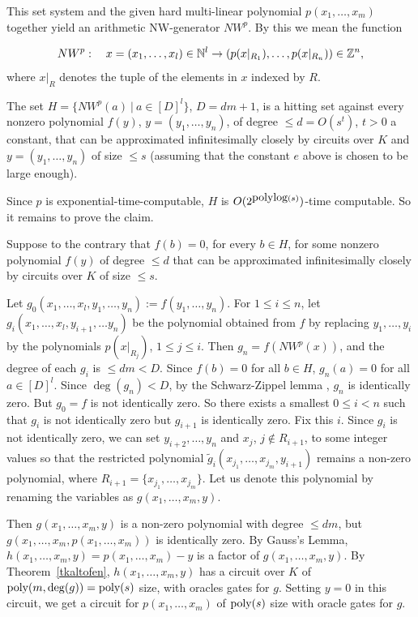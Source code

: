 \documentclass[11pt]{article}
\begin{document}
This set system and  the given hard multi-linear polynomial  $p(x_1,\ldots,x_m)$ 
together  yield an arithmetic NW-generator $NW^p$. By this we mean the function

\begin{equation} \label{eqNW}
NW^p:  \quad x=(x_1,\ldots,x_l) \in \mathbb{N}^l \rightarrow (p(x|_{R_1}),\ldots, p(x|_{R_n})) \in \mathbb{Z}^n, 
\end{equation}
where $x|_{R}$ denotes the tuple of the elements in $x$ indexed by $R$. 

\begin{claim} The set $H=\{ NW^p(a) \ | \ a \in [D]^l\}$,  $D = d m +1$, is a  hitting set against every 
nonzero polynomial $f(y)$, $y=(y_1,\ldots,y_n)$,  of degree $\le d=O(s^t)$, $t>0$ a constant,
that can be approximated infinitesimally closely  by circuits over $K$ 
and $y=(y_1,\ldots,y_n)$ of size $\le s$ (assuming that the constant $e$ above is chosen to be large enough).
\end{claim} 

Since $p$ is exponential-time-computable, $H$ is  $O(2^{{\mbox {polylog}}(s)})$-time computable. So  it remains to prove the claim.

Suppose to the contrary that $f(b) = 0$,  for every $b \in H$, for some nonzero polynomial 
$f(y)$  of degree $\le d$ 
that can be approximated infinitesimally closely  by  circuits over $K$ of size $\le s$.

Let  $g_0(x_1,\ldots,x_l,y_1,\ldots,y_n):=f(y_1,\ldots,y_n)$. For $1 \le i \le n$, let $g_i(x_1,\ldots,x_l,y_{i+1},\ldots y_n)$
be the polynomial obtained from $f$ by replacing $y_1,\ldots,y_i$ by the polynomials $p(x|_{R_j})$, $1 \le j \le i$. 
Then $g_n=f(NW^p(x))$, and the  degree of each $g_i$ is $\le d m < D$.  Since $f(b)=0$ for all $b \in H$, $g_n(a)=0$ for all $a \in [D]^l$.
Since $\deg(g_n) < D$, by the  Schwarz-Zippel lemma \cite{schwarz},   $g_n$ is identically zero.
But $g_0=f$ is not identically zero. So there exists a smallest $0 \le i < n$ such that $g_i$ is not identically zero but 
$g_{i+1}$ is identically zero. Fix this $i$. Since $g_i$ is not identically zero, we can set $y_{i+2},\ldots,y_n$ and $x_j$, $j \not \in R_{i+1}$,
to some integer values so that the restricted polynomial $\tilde g_i(x_{j_1},\ldots,x_{j_m},y_{i+1})$ remains a non-zero polynomial,
where $R_{i+1}=\{x_{j_1},\ldots,x_{j_m}\}$.
Let us denote this polynomial by renaming the variables as $g(x_1,\ldots,x_m,y)$. 

Then  $g(x_1,\ldots,x_m,y)$ is a non-zero polynomial  with degree  $\le d m$, but
$g(x_1,\ldots,x_m, p(x_1,\ldots,x_m))$ is identically zero. By Gauss's Lemma, $h(x_1,\ldots,x_m,y)= p(x_1,\ldots,x_m) - y$
is a factor of $g(x_1,\ldots,x_m,y)$.  By Theorem~\ref{tkaltofen}, 
$h(x_1,\ldots,x_m,y)$ has a circuit over $K$ of ${\mbox {poly}}(m,\deg(g))={\mbox {poly}}(s)$ size, with oracles gates for $g$. 
Setting $y=0$ in this circuit, we get a circuit for  $p(x_1,\ldots,x_m)$  of ${\mbox {poly}}(s)$ size with oracle gates for $g$.
\end{document}
